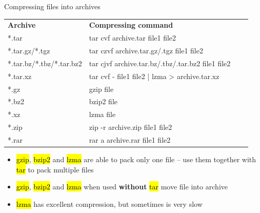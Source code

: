 \documentclass[compress, ucs, xelatex, 11pt, xcolor=svgnames,
  hyperref={
    bookmarks=true,
    unicode=true,
    colorlinks=true,
    pdftitle={Linux, command line and MetaCentrum},
    plainpages=false,
    pdfauthor={Vojtech Zeisek},
    pdfsubject={Course about use of Linux command line, writing shell scripts and using MetaCentrum of CESNET},
    pdfcreator={XeLaTeX},
    pdfkeywords={Linux, GNU, BASH, shell, command line, MetaCentrum},
    linkcolor=Red,
    anchorcolor=Blue,
    citecolor=Purple,
    filecolor=DodgerBlue,
    menucolor=DarkOrchid,
    urlcolor=DeepSkyBlue,
    pdftex},
  url={hyphens, lowtilde} %
  ]{beamer}
\renewcommand{\texttt}[1]{\hl{\ttfamily #1}}
\begin{document}
\begin{frame}{Compressing files into archives}
\begin{center}
\begin{tabular}{llll}
\textbf{Archive} & \textbf{Compressing command}\\
*.tar & tar cvf archive.tar file1 file2\\
*.tar.gz\alert{/}*.tgz & tar czvf archive.tar.gz\alert{/}.tgz file1 file2\\
*.tar.bz\alert{/}*.tbz\alert{/}*.tar.bz2 & tar cjvf archive.tar.bz\alert{/}.tbz\alert{/}.tar.bz2 file1 file2\\
*.tar.xz & tar cvf - file1 file2 | lzma > archive.tar.xz\\
*.gz & gzip file\\
*.bz2 & bzip2 file\\
*.xz & lzma file\\
*.zip & zip -r archive.zip file1 file2\\
*.rar & rar a archive.rar file1 file2\\
\end{tabular}
\end{center}
\begin{itemize}
  \item \texttt{gzip}, \texttt{bzip2} and \texttt{lzma} are able to pack only one file -- use them together with \texttt{tar} to pack multiple files
  \item \texttt{gzip}, \texttt{bzip2} and \texttt{lzma} when used \textbf{without} \texttt{tar} \alert{move} file into archive
  \item \texttt{lzma} has excellent compression, but sometimes is very slow
\end{itemize}
\end{frame}
\end{document}
